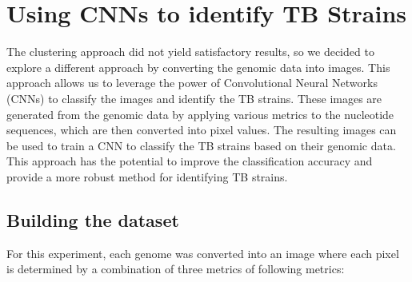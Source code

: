 \chapter{Using CNNs to identify TB Strains}
\label{chap:cnn_tb_strains}

The clustering approach did not yield satisfactory results, so we decided to explore a different approach by converting the genomic
data into images. This approach allows us to leverage the power of Convolutional Neural Networks (CNNs) to classify the images and
identify the TB strains. These images are generated from the genomic data by applying various metrics to the nucleotide sequences,
which are then converted into pixel values. The resulting images can be used to train a CNN to classify the TB strains based on their
genomic data. This approach has the potential to improve the classification accuracy and provide a more robust method for identifying
TB strains.


\section{Building the dataset}
\label{sec:building_dataset}

For this experiment, each genome was converted into an image where each pixel is determined by a combination of three metrics of
following metrics:

